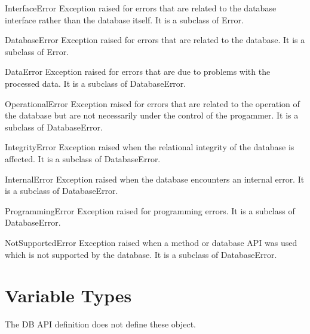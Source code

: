 \documentclass{manual}
\begin{document}
\begin{datadesc}{InterfaceError}
  Exception raised for errors that are related to the database interface rather
  than the database itself. It is a subclass of Error.
\end{datadesc}

\begin{datadesc}{DatabaseError}
  Exception raised for errors that are related to the database. It is a
  subclass of Error.
\end{datadesc}

\begin{datadesc}{DataError}
  Exception raised for errors that are due to problems with the processed data.
  It is a subclass of DatabaseError.
\end{datadesc}

\begin{datadesc}{OperationalError}
  Exception raised for errors that are related to the operation of the database
  but are not necessarily under the control of the progammer. It is a
  subclass of DatabaseError.
\end{datadesc}

\begin{datadesc}{IntegrityError}
  Exception raised when the relational integrity of the database is affected.
  It is a subclass of DatabaseError.
\end{datadesc}
 
\begin{datadesc}{InternalError}
  Exception raised when the database encounters an internal error.
  It is a subclass of DatabaseError.
\end{datadesc}
 
\begin{datadesc}{ProgrammingError}
  Exception raised for programming errors. It is a subclass of DatabaseError.
\end{datadesc}
 
\begin{datadesc}{NotSupportedError}
  Exception raised when a method or database API was used which is not
  supported by the database. It is a subclass of DatabaseError.
\end{datadesc}
 
\section{Variable Types}\label{vartypes}

 The DB API definition does not define these object.
\end{document}
